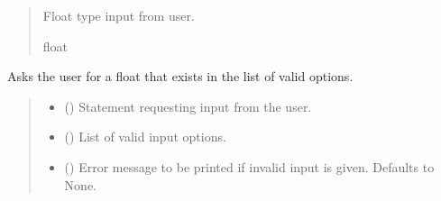 \documentclass[letterpaper,10pt,english]{sphinxmanual}
\begin{document}
\begin{fulllineitems}
\begin{fulllineitems}
\begin{quote}
\begin{description}
\sphinxAtStartPar
Float type input from user.

\sphinxAtStartPar
float

\end{description}\end{quote}

\end{fulllineitems}


\begin{fulllineitems}
\label{\detokenize{Setup.Inputs:Setup.Inputs.GetUserInput.UserInput.AskForFloatInList}}
\pysigstartsignatures
{}
\pysigstopsignatures
\sphinxAtStartPar
Asks the user for a float that exists in the list of valid options.
\begin{quote}\begin{description}
\begin{itemize}
\item {} 
\sphinxAtStartPar
{} () \textendash{} Statement requesting input from the user.

\item {} 
\sphinxAtStartPar
{} () \textendash{} List of valid input options.

\item {} 
\sphinxAtStartPar
{} (\sphinxstyleliteralemphasis{\sphinxupquote{ | }}\sphinxstyleliteralemphasis{\sphinxupquote{, }}) \textendash{} Error message to be printed if invalid input is given.                 Defaults to None.


\end{itemize}
\end{description}
\end{quote}
\end{fulllineitems}
\end{fulllineitems}
\end{document}
